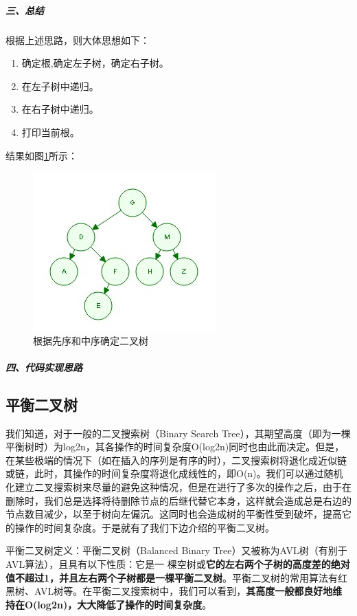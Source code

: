 \documentclass[UTF8,a4paper,12pt]{ctexbook}
\begin{document}
		\subparagraph{三、总结}
			根据上述思路，则大体思想如下：
			
			\begin{enumerate}[itemindent = 1em]
				\item 确定根,确定左子树，确定右子树。
				\item 在左子树中递归。
				\item 在右子树中递归。
				\item 打印当前根。
			\end{enumerate}
			
			结果如图\ref{mid_first}所示：
				\begin{figure}
					\centering
					\includegraphics[scale = 1]{Tree_Mid_First.jpg}
					\caption{根据先序和中序确定二叉树}
					\label{mid_first}
				\end{figure}
		
		\subparagraph{四、代码实现思路}


	\subsection{平衡二叉树}
		我们知道，对于一般的二叉搜索树（Binary Search Tree），其期望高度（即为一棵平衡树时）为log2n，其各操作的时间复杂度O(log2n)同时也由此而决定。但是，在某些极端的情况下（如在插入的序列是有序的时），二叉搜索树将退化成近似链或链，此时，其操作的时间复杂度将退化成线性的，即O(n)。我们可以通过随机化建立二叉搜索树来尽量的避免这种情况，但是在进行了多次的操作之后，由于在删除时，我们总是选择将待删除节点的后继代替它本身，这样就会造成总是右边的节点数目减少，以至于树向左偏沉。这同时也会造成树的平衡性受到破坏，提高它的操作的时间复杂度。于是就有了我们下边介绍的平衡二叉树。
		
		平衡二叉树定义：平衡二叉树（Balanced Binary Tree）又被称为AVL树（有别于AVL算法），且具有以下性质：它是一 棵空树或\textbf{它的左右两个子树的高度差的绝对值不超过1，并且左右两个子树都是一棵平衡二叉树}。平衡二叉树的常用算法有红黑树、AVL树等。在平衡二叉搜索树中，我们可以看到，\textbf{其高度一般都良好地维持在O(log2n)，大大降低了操作的时间复杂度}。
		
\end{document}

